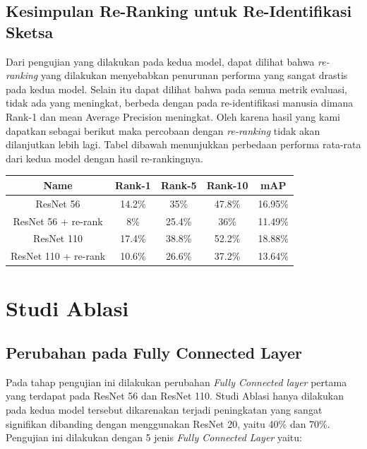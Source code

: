 \pagebreak

\subsection{Kesimpulan Re-Ranking untuk Re-Identifikasi Sketsa}
Dari pengujian yang dilakukan pada kedua model, dapat dilihat bahwa \textit{re-ranking} yang dilakukan menyebabkan penurunan performa yang sangat drastis pada kedua model. Selain itu dapat dilihat bahwa pada semua metrik evaluasi, tidak ada yang meningkat, berbeda dengan pada re-identifikasi manusia dimana Rank-1 dan mean Average Precision meningkat. Oleh karena hasil yang kami dapatkan sebagai berikut maka percobaan dengan \textit{re-ranking} tidak akan dilanjutkan lebih lagi. Tabel dibawah menunjukkan perbedaan performa rata-rata dari kedua model dengan hasil re-rankingnya.

\begin{table}[h!]
	\begin{center}
		\begin{tabular}{|c|c|c|c|c|}
			\hline
			\textbf{Name} & \textbf{Rank-1} & \textbf{Rank-5} & \textbf{Rank-10} & \textbf{mAP} \\ \hline
			ResNet 56 & 14.2\% & 35\% & 47.8\% & 16.95\%\\ \hline
			ResNet 56 + re-rank  & 8\% & 25.4\% & 36\% & 11.49\%\\ \hline
			ResNet 110 & 17.4\% & 38.8\% & 52.2\% & 18.88\%\\ \hline
			ResNet 110 + re-rank & 10.6\% & 26.6\% & 37.2\% & 13.64\%\\ \hline
		\end{tabular}
	\end{center}
\end{table}
\vspace{-3ex}
\section{Studi Ablasi}
\subsection{Perubahan pada Fully Connected Layer}
\vspace{1ex}

Pada tahap pengujian ini dilakukan perubahan \textit{Fully Connected layer} pertama yang terdapat pada ResNet 56 dan ResNet 110. Studi Ablasi hanya dilakukan pada kedua model tersebut dikarenakan terjadi peningkatan yang sangat signifikan dibanding dengan menggunakan ResNet 20, yaitu 40\% dan 70\%. Pengujian ini dilakukan dengan 5 jenis \textit{Fully Connected Layer} yaitu:

